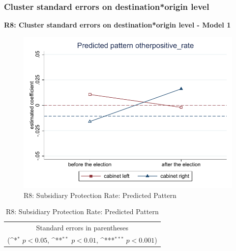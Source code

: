 \documentclass[10pt,a4paper]{scrartcl}
\begin{document}


\clearpage
\FloatBarrier
\subsubsection{Cluster standard errors on destination*origin level}
\textbf{R8: Cluster standard errors on destination*origin level - Model 1}
\begin{figure}[!ht]
	\centering
	\includegraphics[width=1\textwidth]{figures_edited/otherpositive_rate_graph1_R8.pdf}
	\caption{R8: Subsidiary Protection Rate: Predicted Pattern}
\end{figure}

\begin{table}[!ht]\centering
	\renewcommand{\arraystretch}{1.25}
	\def\sym#1{\ifmmode^{#1}\else\(^{#1}\)\fi}
	\caption{R8: Subsidiary Protection Rate: Predicted Pattern}
	\begin{tabular}{l*{2}{c}}
		\hline\hline
		
		\hline\hline
		\multicolumn{3}{c}{\footnotesize Standard errors in parentheses} \\
		\multicolumn{3}{c}{\footnotesize (\sym{*} \(p<0.05\), \sym{**} \(p<0.01\), \sym{***} \(p<0.001\))}\\
	\end{tabular}
\end{table}
\end{document}
